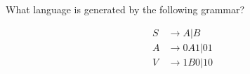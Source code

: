 \subsection{}

What language is generated by the following grammar?

\begin{align*}
S &\rightarrow A | B\\
A &\rightarrow 0A1 | 01\\
V &\rightarrow 1B0 | 10
\end{align*}


